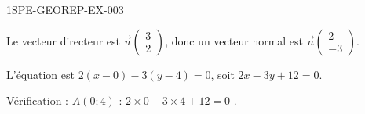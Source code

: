 \begin{corrige}{1SPE-GEOREP-EX-003}


\textbf{} Le vecteur directeur est $\vec{u}\begin{pmatrix} 3 \\ 2 \end{pmatrix}$, donc un vecteur normal est $\vec{n}\begin{pmatrix} 2 \\ -3 \end{pmatrix}$.

L'équation est $2(x - 0) - 3(y - 4) = 0$, soit $\boxed{2x - 3y + 12 = 0}$.

Vérification : $A(0 ; 4)$ : $2 \times 0 - 3 \times 4 + 12 = 0$ \checkmark.

\end{corrige}
